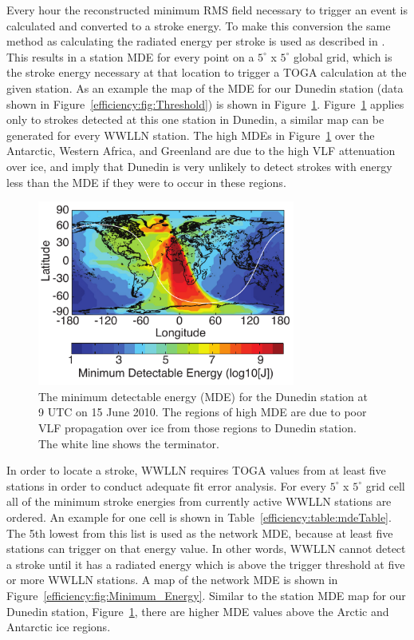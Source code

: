 Every hour the reconstructed minimum RMS field necessary to trigger an event is calculated and converted to a stroke energy.
To make this conversion the same method as calculating the radiated energy per stroke is used as described in \citet{Hutchins2012}.
This results in a station MDE for every point on a $5^\circ$ x $5^\circ$ global grid, which is the stroke energy necessary at that location to trigger a TOGA calculation at the given station.
As an example the map of the MDE for our Dunedin station (data shown in Figure~\ref{efficiency:fig:Threshold}) is shown in Figure~\ref{efficiency:fig:Threshold_Map}.
Figure~\ref{efficiency:fig:Threshold_Map} applies only to strokes detected at this one station in Dunedin, a similar map can be generated for every WWLLN station.
The high MDEs in Figure~\ref{efficiency:fig:Threshold_Map} over the Antarctic, Western Africa, and Greenland are due to the high VLF attenuation over ice, and imply that Dunedin is very unlikely to detect strokes with energy less than the MDE if they were to occur in these regions.

\begin{figure}[ht!]
   \centering
\noindent\includegraphics[width=20pc]{efficiency/Figures/2012RS005049-p3.pdf} 
   \caption{The minimum detectable energy (MDE) for the Dunedin station at 9 UTC on 15 June 2010.
The regions of high MDE are due to poor VLF propagation over ice from those regions to Dunedin station.
The white line shows the terminator.}
   \label{efficiency:fig:Threshold_Map}
\end{figure}

In order to locate a stroke, WWLLN requires TOGA values from at least five stations in order to conduct adequate fit error analysis.
For every $5^\circ$ x $5^\circ$ grid cell all of the minimum stroke energies from currently active WWLLN stations are ordered.
An example for one cell is shown in Table~\ref{efficiency:table:mdeTable}.
The 5th lowest from this list is used as the network MDE, because at least five stations can trigger on that energy value.
In other words, WWLLN cannot detect a stroke until it has a radiated energy which is above the trigger threshold at five or more WWLLN stations.
A map of the network MDE is shown in Figure~\ref{efficiency:fig:Minimum_Energy}.
Similar to the station MDE map for our Dunedin station, Figure~\ref{efficiency:fig:Threshold_Map}, there are higher MDE values above the Arctic and Antarctic ice regions.

